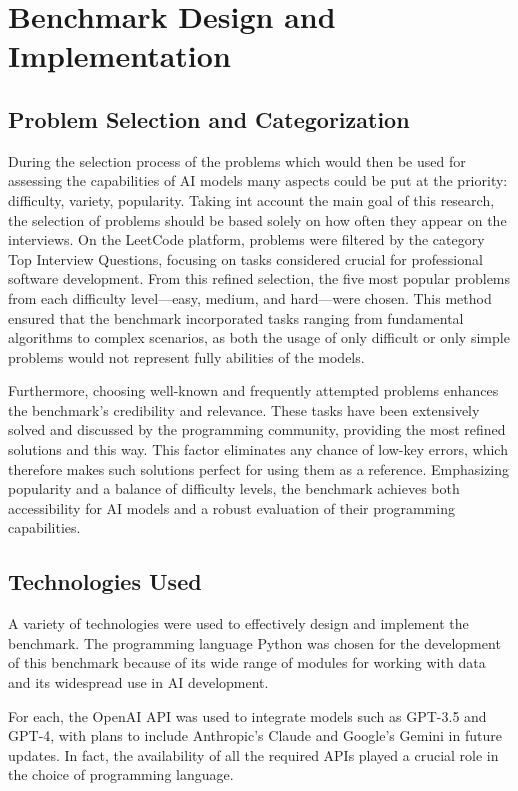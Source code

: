 \section{Benchmark Design and Implementation}

\subsection{Problem Selection and Categorization}

During the selection process of the problems which would then be used for assessing the capabilities of AI models many aspects could be put at the priority: difficulty, variety, popularity. Taking int account the main goal of this research, the selection of problems should be based solely on how often they appear on the interviews. On the LeetCode platform, problems were filtered by the category Top Interview Questions, focusing on tasks considered crucial for professional software development. From this refined selection, the five most popular problems from each difficulty level—easy, medium, and hard—were chosen. This method ensured that the benchmark incorporated tasks ranging from fundamental algorithms to complex scenarios, as both the usage of only difficult or only simple problems would not represent fully abilities of the models.

Furthermore, choosing well-known and frequently attempted problems enhances the benchmark’s credibility and relevance. These tasks have been extensively solved and discussed by the programming community, providing the most refined solutions and this way. This factor eliminates any chance of low-key errors, which therefore makes such solutions perfect for using them as a reference. Emphasizing popularity and a balance of difficulty levels, the benchmark achieves both accessibility for AI models and a robust evaluation of their programming capabilities.

\subsection{Technologies Used}


A variety of technologies were used to effectively design and implement the benchmark. The programming language Python was chosen for the development of this benchmark because of its wide range of modules for working with data and its widespread use in AI development.

For each, the OpenAI API was used to integrate models such as GPT-3.5 and GPT-4, with plans to include Anthropic's Claude and Google's Gemini in future updates.
In fact, the availability of all the required APIs played a crucial role in the choice of programming language.

